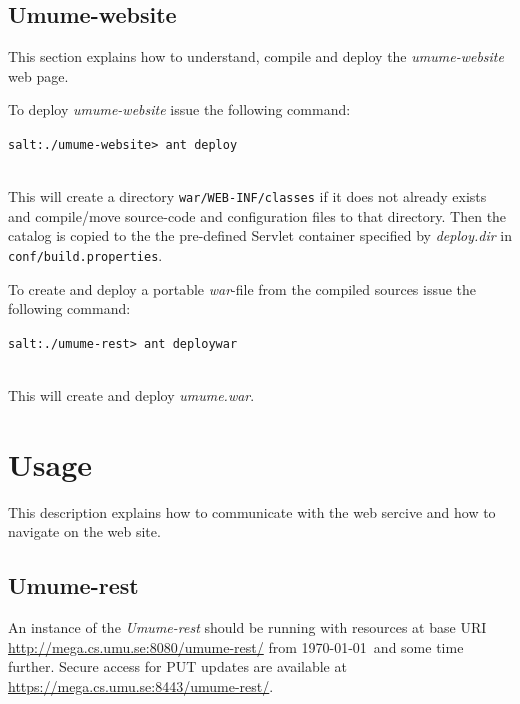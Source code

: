\documentclass[titlepage, twocolumn, a4paper, 10pt]{article}
\begin{document}
\subsection{Umume-website}
This section explains how to understand, compile and deploy the
\textit{umume-website} web page.

To deploy \textit{umume-website} issue the following command:\\
\begin{footnotesize}
  \verb!salt:./umume-website> ant deploy!
\end{footnotesize}\\
This will create a directory \verb!war/WEB-INF/classes! if it does not
already exists and compile/move source-code and configuration files to
that directory. Then the catalog is copied to the the pre-defined
Servlet container specified by \textit{deploy.dir} in
\texttt{conf/build.properties}.

To create and deploy a portable \textit{war}-file from the compiled
sources issue the following command:\\
\begin{footnotesize}
  \verb!salt:./umume-rest> ant deploywar!
\end{footnotesize}\\
This will create and deploy \textit{umume.war}.

\section{Usage}\label{sec:usage}

This description explains how to communicate with the web sercive and
how to navigate on the web site.

\subsection{Umume-rest}
An instance of the \textit{Umume-rest} should be running with
resources at base URI \url{http://mega.cs.umu.se:8080/umume-rest/}
from \today\ and some time further. Secure access for PUT updates are
available at \url{https://mega.cs.umu.se:8443/umume-rest/}.
\end{document}
